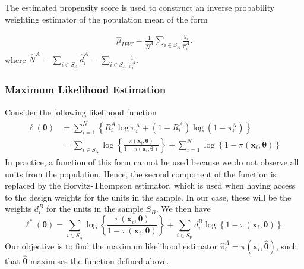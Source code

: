 \documentclass[
]{jss}
\begin{document}
The estimated propensity score is used to construct an inverse
probability weighting estimator of the population mean of the form

\begin{equation}
\begin{gathered}
\hat{\mu}_{I P W}=\frac{1}{\hat{N}^A} \sum_{i \in S_A} \frac{y_i}{\hat{\pi}_i^A}.
\end{gathered}
\end{equation} where
\(\hat{N}^A = \sum_{i \in S_A} \hat{d}_i^A = \sum_{i \in S_A} \frac{1}{\hat{\pi}_i^A}\).

\subsubsection{Maximum Likelihood
Estimation}\label{maximum-likelihood-estimation}

Consider the following likelihood function \begin{align}
    \begin{split}
 \ell(\boldsymbol{\theta}) & =\sum_{i=1}^N\left\{R_i^A \log \pi_i^{\mathrm{A}}+\left(1-R_i^A\right) \log \left(1-\pi_i^{\mathrm{A}}\right)\right\} \\ & =\sum_{i \in S_{\mathrm{A}}} \log \left\{\frac{\pi\left(\boldsymbol{x}_i, \boldsymbol{\theta}\right)}{1-\pi\left(\boldsymbol{x}_i, \boldsymbol{\theta}\right)}\right\}+\sum_{i=1}^N \log \left\{1-\pi\left(\boldsymbol{x}_i, \boldsymbol{\theta}\right)\right\}
    \end{split}
\end{align} In practice, a function of this form cannot be used because
we do not observe all units from the population. Hence, the second
component of the function is replaced by the Horvitz-Thompson estimator,
which is used when having access to the design weights for the units in
the sample. In our case, these will be the weights \(d_i^B\) for the
units in the sample \(S_B\). We then have \begin{equation}
\ell^*(\boldsymbol{\theta})=\sum_{i \in S_{\mathrm{A}}} \log \left\{\frac{\pi\left(\boldsymbol{x}_i, \boldsymbol{\theta}\right)}{1-\pi\left(\boldsymbol{x}_i, \boldsymbol{\theta}\right)}\right\}+\sum_{i \in S_{\mathrm{B}}} d_i^{\mathrm{B}} \log \left\{1-\pi\left(\boldsymbol{x}_i, \boldsymbol{\theta}\right)\right\}.
\end{equation} Our objective is to find the maximum likelihood estimator
\(\hat{\pi}_{i}^{A} = \pi(\boldsymbol{x}_{i}, \hat{\boldsymbol{\theta}})\),
such that \(\hat{\boldsymbol{\theta}}\) maximises the function defined
above.
\end{document}

